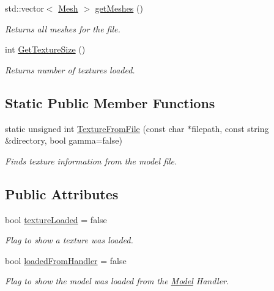 \begin{DoxyCompactItemize}
\mbox{\label{class_model_a12c9acf4e5cf6150de113251148b98f8}} 
std\+::vector$<$ \mbox{\hyperlink{class_mesh}{Mesh}} $>$ \mbox{\hyperlink{class_model_a12c9acf4e5cf6150de113251148b98f8}{get\+Meshes}} ()
\begin{DoxyCompactList}\small\item\em Returns all meshes for the file. \end{DoxyCompactList}\item 
\mbox{\label{class_model_a6e6ff4851692b4eb499108c7c4df6da3}} 
int \mbox{\hyperlink{class_model_a6e6ff4851692b4eb499108c7c4df6da3}{Get\+Texture\+Size}} ()
\begin{DoxyCompactList}\small\item\em Returns number of textures loaded. \end{DoxyCompactList}\end{DoxyCompactItemize}
\subsection*{Static Public Member Functions}
\begin{DoxyCompactItemize}
\item 
\mbox{\label{class_model_a16c263d87f6368d21d5ab255468c2c90}} 
static unsigned int \mbox{\hyperlink{class_model_a16c263d87f6368d21d5ab255468c2c90}{Texture\+From\+File}} (const char $\ast$filepath, const string \&directory, bool gamma=false)
\begin{DoxyCompactList}\small\item\em Finds texture information from the model file. \end{DoxyCompactList}\end{DoxyCompactItemize}
\subsection*{Public Attributes}
\begin{DoxyCompactItemize}
\item 
\mbox{\label{class_model_a1c0adafee07d69e3d3c87f09bbbb1f47}} 
bool \mbox{\hyperlink{class_model_a1c0adafee07d69e3d3c87f09bbbb1f47}{texture\+Loaded}} = false
\begin{DoxyCompactList}\small\item\em Flag to show a texture was loaded. \end{DoxyCompactList}\item 
\mbox{\label{class_model_a966cb2bef7912d9cda8884eaa17242b6}} 
bool \mbox{\hyperlink{class_model_a966cb2bef7912d9cda8884eaa17242b6}{loaded\+From\+Handler}} = false
\begin{DoxyCompactList}\small\item\em Flag to show the model was loaded from the \mbox{\hyperlink{class_model}{Model}} Handler. \end{DoxyCompactList}\end{DoxyCompactItemize}


